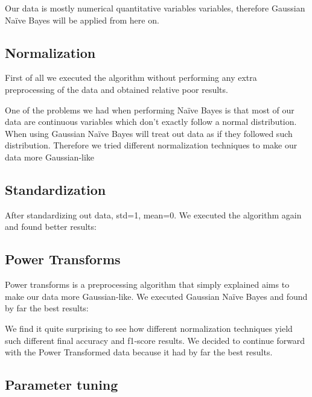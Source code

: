 Our data is mostly numerical quantitative variables variables, therefore Gaussian Na\"ive Bayes will be applied from here on.

\subsection{Normalization}

First of all we executed the algorithm without performing any extra preprocessing of the data and obtained
relative poor results.


One of the problems we had when performing Na\"ive Bayes is that most of our data are continuous variables
which don't exactly follow a normal distribution. When using Gaussian Na\"ive Bayes will treat out data 
as if they followed such distribution. Therefore we tried different normalization techniques to make our
data more Gaussian-like

\subsection{Standardization}

After standardizing out data, std=1, mean=0. We executed the algorithm again and found better results:


\subsection{Power Transforms}

Power transforms is a preprocessing algorithm that simply explained aims to make our data more Gaussian-like. We executed Gaussian Na\"ive Bayes and found by far the best results:


We find it quite surprising to see how different normalization techniques yield such 
different final accuracy and f1-score results. We decided to continue forward with the Power 
Transformed data because it had by far the best results.

\subsection{Parameter tuning}

